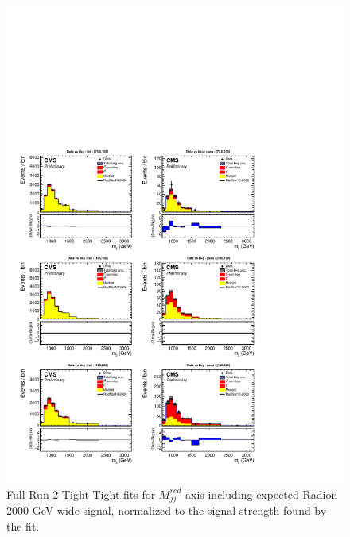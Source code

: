\begin{figure}[!htb]
	\centering
	\includegraphics[width=1\textwidth]{Figures/postfit_projy_fits_TTwide.pdf}
	\caption{Full Run 2 Tight Tight fits for $M_{jj}^{red}$ axis including expected Radion 2000 GeV wide signal, normalized to the signal strength found by the fit.}
	\label{fig:TTmjjwide}
\end{figure}
